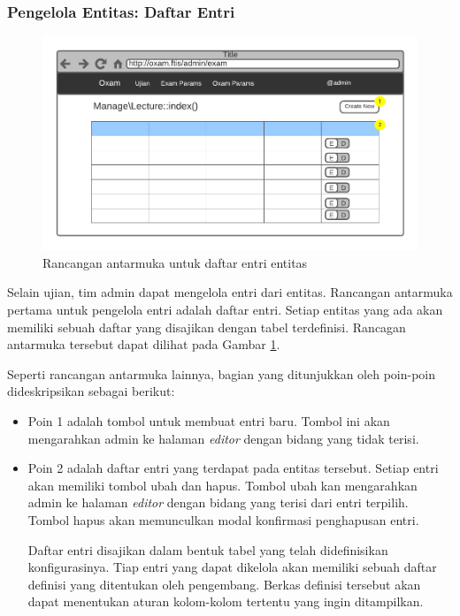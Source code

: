 \subsubsection{Pengelola Entitas: Daftar Entri}
    \begin{figure}
        \centering
        \includegraphics{Gambar/mockups/Mockup--Admin - Entity Lister.pdf}
        \caption{Rancangan antarmuka untuk daftar entri entitas}
        \label{fig:mockup_admin_entity_lister}
    \end{figure}
    Selain ujian, tim admin dapat mengelola entri dari entitas. Rancangan
    antarmuka pertama untuk pengelola entri adalah daftar entri. Setiap entitas
    yang ada akan memiliki sebuah daftar yang disajikan dengan tabel
    terdefinisi. Rancagan antarmuka tersebut dapat dilihat pada Gambar
    \ref{fig:mockup_admin_entity_lister}.
    
    Seperti rancangan antarmuka lainnya, bagian yang ditunjukkan oleh poin-poin
    dideskripsikan sebagai berikut:
    \begin{itemize}
        \item Poin 1 adalah tombol untuk membuat entri baru. Tombol ini akan
            mengarahkan admin ke halaman \textit{editor} dengan bidang yang
            tidak terisi.
            
        \item Poin 2 adalah daftar entri yang terdapat pada entitas tersebut.
            Setiap entri akan memiliki tombol ubah dan hapus. Tombol ubah kan
            mengarahkan admin ke halaman \textit{editor} dengan bidang yang
            terisi dari entri terpilih. Tombol hapus akan memunculkan modal
            konfirmasi penghapusan entri.
            
            Daftar entri disajikan dalam bentuk tabel yang telah didefinisikan
            konfigurasinya. Tiap entri yang dapat dikelola akan memiliki sebuah
            daftar definisi yang ditentukan oleh pengembang. Berkas definisi
            tersebut akan dapat menentukan aturan kolom-kolom tertentu yang
            ingin ditampilkan.
    \end{itemize}
    
